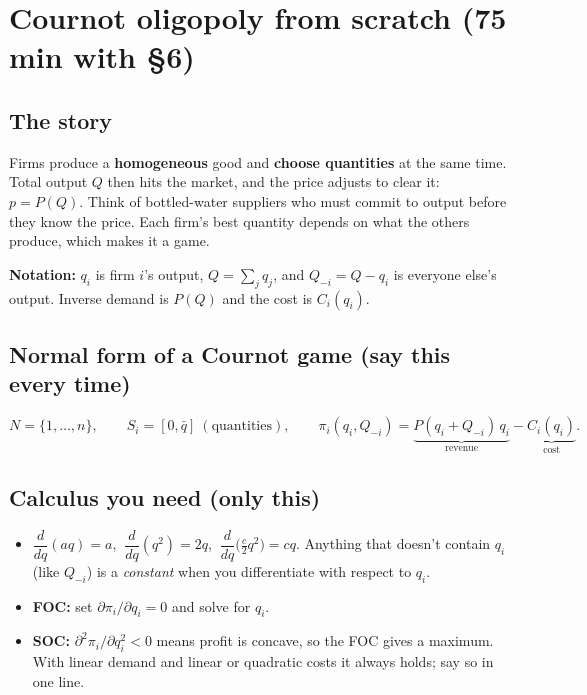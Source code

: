 \documentclass[11pt]{article}
\begin{document}
\section{Cournot oligopoly from scratch (75 min with \S6)}

\subsection{The story}
Firms produce a \textbf{homogeneous} good and \textbf{choose quantities} at the same time. Total output $Q$ then hits the market, and the price adjusts to clear it: $p=P(Q)$. Think of bottled-water suppliers who must commit to output before they know the price. Each firm's best quantity depends on what the others produce, which makes it a game.

\textbf{Notation:} $q_i$ is firm $i$'s output, $Q=\sum_j q_j$, and $Q_{-i}=Q-q_i$ is everyone else's output. Inverse demand is $P(Q)$ and the cost is $C_i(q_i)$.

\subsection{Normal form of a Cournot game (say this every time)}
\[
N=\{1,\dots,n\},\qquad S_i=[0,\bar q]\ (\text{quantities}),\qquad
\pi_i(q_i,Q_{-i})=\underbrace{P(q_i+Q_{-i})\,q_i}_{\text{revenue}}-\underbrace{C_i(q_i)}_{\text{cost}}.
\]

\subsection{Calculus you need (only this)}
\begin{itemize}
\item $\dfrac{d}{dq}(aq)=a$, $\ \dfrac{d}{dq}(q^2)=2q$, $\ \dfrac{d}{dq}\big(\tfrac c2q^2\big)=cq$. Anything that doesn't contain $q_i$ (like $Q_{-i}$) is a \emph{constant} when you differentiate with respect to $q_i$.
\item \textbf{FOC:} set $\partial\pi_i/\partial q_i=0$ and solve for $q_i$.
\item \textbf{SOC:} $\partial^2\pi_i/\partial q_i^2<0$ means profit is concave, so the FOC gives a maximum. With linear demand and linear or quadratic costs it always holds; say so in one line.
\end{itemize}
\end{document}
